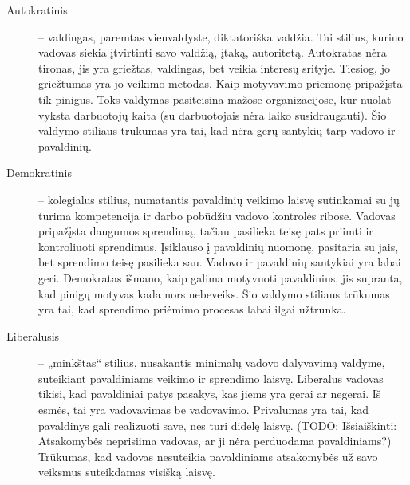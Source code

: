 \begin{description}
  \item[Autokratinis] – valdingas, paremtas vienvaldyste, diktatoriška
    valdžia. Tai stilius, kuriuo vadovas siekia įtvirtinti savo valdžią,
    įtaką, autoritetą. Autokratas nėra tironas, jis yra griežtas,
    valdingas, bet veikia interesų srityje. Tiesiog, jo griežtumas yra
    jo veikimo metodas. Kaip motyvavimo priemonę pripažįsta tik pinigus.
    Toks valdymas pasiteisina mažose organizacijose, kur nuolat vyksta
    darbuotojų kaita (su darbuotojais nėra laiko susidraugauti).
    Šio valdymo stiliaus trūkumas yra tai, kad nėra gerų santykių
    tarp vadovo ir pavaldinių.
  \item[Demokratinis] – kolegialus stilius, numatantis pavaldinių
    veikimo laisvę sutinkamai su jų turima kompetencija ir darbo
    pobūdžiu vadovo kontrolės ribose. Vadovas pripažįsta daugumos
    sprendimą, tačiau pasilieka teisę pats priimti ir kontroliuoti
    sprendimus. Įsiklauso į pavaldinių nuomonę, pasitaria su jais,
    bet sprendimo teisę pasilieka sau. Vadovo ir pavaldinių
    santykiai yra labai geri. Demokratas išmano, kaip galima
    motyvuoti pavaldinius, jis supranta, kad pinigų motyvas kada
    nors nebeveiks. Šio valdymo stiliaus trūkumas yra tai, kad
    sprendimo priėmimo procesas labai ilgai užtrunka.
  \item[Liberalusis] – „minkštas“ stilius, nusakantis minimalų vadovo
    dalyvavimą valdyme, suteikiant pavaldiniams veikimo ir sprendimo
    laisvę. Liberalus vadovas tikisi, kad pavaldiniai patys pasakys,
    kas jiems yra gerai ar negerai. Iš esmės, tai yra vadovavimas be
    vadovavimo. Privalumas yra tai, kad pavaldinys gali realizuoti
    save, nes turi didelę laisvę. (TODO: Išsiaiškinti: Atsakomybės
    neprisiima vadovas, ar ji nėra perduodama pavaldiniams?) Trūkumas,
    kad vadovas nesuteikia pavaldiniams atsakomybės už savo veiksmus
    suteikdamas visišką laisvę.
\end{description}

